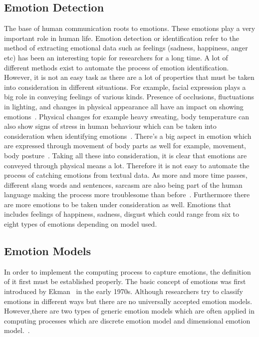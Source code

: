 \documentclass[runningheads]{llncs}
\begin{document}
\subsection{Emotion Detection}
The base of human communication roots to emotions. These emotions play a very important role in human life. Emotion detection or identification refer to the method  of extracting emotional data such as feelings (sadness, happiness, anger etc) has been an interesting topic for researchers for a long time. A lot of different methods exist to automate the process of emotion identification. However, it is not an easy task as there are a lot of properties that must be taken into consideration in different situations. For example, facial expression plays a big role in conveying feelings of various kinds. Presence of occlusions, fluctuations in lighting, and changes in physical appearance all have an impact on showing emotions~\cite{ref7}. Physical changes for example heavy sweating, body temperature can also show signs of stress in human behaviour which can be taken into consideration when identifying emotions~\cite{ref8}. There's a big aspect in emotion which are expressed through movement of body parts as well for example, movement, body posture~\cite{ref9}. Taking all these into consideration, it is clear that emotions are conveyed through physical means a lot. Therefore it is not easy to automate the process of catching emotions from textual data. As more and more time passes, different slang words and sentences, sarcasm are also being part of the human language making the process more troublesome than before~\cite{ref6}. Furthermore there are more emotions to be taken under consideration as well. Emotions that includes feelings of happiness, sadness, disgust which could range from six to eight types of emotions depending on model used. 

\subsection{Emotion Models}
In order to implement the computing process to capture emotions, the definition of it first must be established properly. The basic concept of emotions was first introduced by Ekman~\cite{ref11} in the early 1970s. Although researchers try to classify emotions in different ways but there are no universally accepted emotion models. However,there are two types of generic emotion models which are often applied in computing processes which are discrete emotion model and dimensional emotion model.~\cite{ref11,ref12}.
\end{document}
